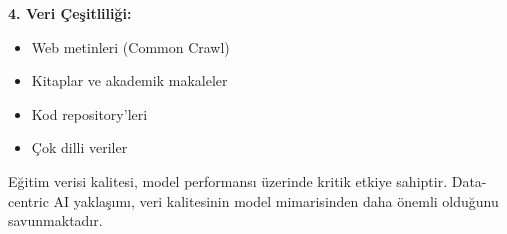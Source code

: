 \documentclass[conference]{IEEEtran}
\begin{document}
\textbf{4. Veri Çeşitliliği:}
\begin{itemize}
    \item Web metinleri (Common Crawl)
    \item Kitaplar ve akademik makaleler
    \item Kod repository'leri
    \item Çok dilli veriler
\end{itemize}

Eğitim verisi kalitesi, model performansı üzerinde kritik etkiye sahiptir. Data-centric AI yaklaşımı, veri kalitesinin model mimarisinden daha önemli olduğunu savunmaktadır.
\end{document}
